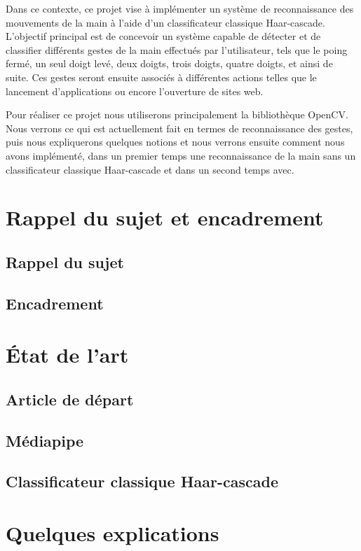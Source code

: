 \documentclass[11pt]{article}
\begin{document}
Dans ce contexte, ce projet vise à implémenter un système de reconnaissance des mouvements de la main à l’aide d’un classificateur classique Haar-cascade. 
L'objectif principal est de concevoir un système capable de détecter et de classifier différents gestes de la main effectués par l'utilisateur, 
tels que le poing fermé, un seul doigt levé, deux doigts, trois doigts, quatre doigts, et ainsi de suite. Ces gestes seront ensuite associés à différentes 
actions telles que le lancement d'applications ou encore l'ouverture de sites web. \bigbreak

Pour réaliser ce projet nous utiliserons principalement la bibliothèque OpenCV. Nous verrons ce qui est actuellement fait en termes de reconnaissance des 
gestes, puis nous expliquerons quelques notions et nous verrons ensuite comment nous avons implémenté, dans un premier temps une reconnaissance de la main 
sans un classificateur classique Haar-cascade et dans un second temps avec.

\newpage

\section{Rappel du sujet et encadrement}
\subsection{Rappel du sujet}
\subsection{Encadrement}
\newpage

\section{\'Etat de l'art}
\subsection{Article de départ}
\subsection{Médiapipe}
\subsection{Classificateur classique Haar-cascade}
\newpage

\section{Quelques explications}
\end{document}
